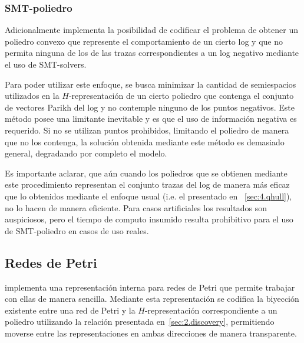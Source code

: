 \subsubsection{SMT-poliedro}
\label{sec:4.smthull}

Adicionalmente \pachtool implementa la posibilidad de codificar el problema de obtener un 
poliedro convexo que represente el comportamiento de un cierto log y que no permita ninguna de los 
de las trazas correspondientes a un log negativo mediante el uso de SMT-solvers.

Para poder utilizar este enfoque, se busca minimizar la cantidad de semiespacios utilizados
en la $H$-representación de un cierto poliedro que contenga el conjunto de vectores Parikh
del log y no contemple ninguno de los puntos negativos.
Este método posee una limitante inevitable y es que el uso de información negativa es requerido.
Si no se utilizan puntos prohibidos, limitando el poliedro de manera que no los contenga,
la solución obtenida mediante este método es demasiado general, degradando por completo el modelo.

Es importante aclarar, que aún cuando los poliedros que se obtienen mediante este procedimiento 
representan el conjunto trazas del log de manera más eficaz que lo obtenidos mediante el 
enfoque usual (i.e. el presentado en ~\autoref{sec:4.qhull}), no lo hacen de manera eficiente.
Para casos artificiales los resultados son auspiciosos, pero el tiempo de computo insumido 
resulta prohibitivo para el uso de SMT-poliedro en casos de uso reales.

\subsection{Redes de Petri}
\label{sec:4.petri}

\pachtool implementa una representación interna para redes de Petri que permite trabajar con ellas de manera sencilla.
Mediante esta representación se codifica la biyección existente entre una red de Petri y la $H$-representación 
correspondiente a un poliedro utilizando la relación presentada en~\autoref{sec:2.discovery}, permitiendo
moverse entre las representaciones en ambas direcciones de manera transparente.

